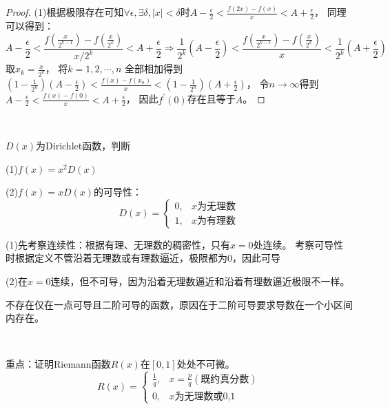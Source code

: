 \begin{proof}
  (1)根据极限存在可知$\forall \epsilon, \exists \delta, |x| < \delta$时$A - \frac{\epsilon}{2} < \frac{f(2x) - f(x)}{x} < A + \frac{\epsilon}{2}$，
  同理可以得到：
  \begin{equation*}
    A - \frac{\epsilon}{2} < \frac{f(\frac{x}{2^{k-1}}) - f(\frac{x}{2^k})}{x/2^k} < A + \frac{\epsilon}{2} \Rightarrow \frac{1}{2^k}(A - \frac{\epsilon}{2}) < \frac{f(\frac{x}{2^{k-1}}) - f(\frac{x}{2^k})}{x} < \frac{1}{2^k} (A + \frac{\epsilon}{2})
  \end{equation*}
  取$x_k = \frac{x}{2^k}$，
  将$k = 1,2,\cdots,n$
  全部相加得到$(1 - \frac{1}{2^n})(A - \frac{\epsilon}{2}) < \frac{f(x) - f(x_n)}{x} < (1 - \frac{1}{2^n})(A + \frac{\epsilon}{2})$，
  令$n \rightarrow \infty$得到$A - \frac{\epsilon}{2} < \frac{f(x) - f(0)}{x} < A + \frac{\epsilon}{2}$，
  因此$f^{\prime}(0)$存在且等于$A$。
\end{proof}

~

\begin{exercise}[Dirichlet函数的可微性]
  $D(x)$为Dirichlet函数，判断

  (1)$f(x) = x^2D(x)$

  (2)$f(x) = xD(x)$的可导性：
  \begin{equation*}
    D(x) =
    \begin{cases}
      0, & x\text{为无理数}\\
      1, & x\text{为有理数}
    \end{cases}
  \end{equation*}
\end{exercise}

\begin{solution}
  (1)先考察连续性：根据有理、无理数的稠密性，只有$x = 0$处连续。
  考察可导性时根据定义不管沿着无理数或有理数逼近，极限都为$0$，因此可导

  (2)在$x = 0$连续，但不可导，因为沿着无理数逼近和沿着有理数逼近极限不一样。
\end{solution}

\begin{note}
  不存在仅在一点可导且二阶可导的函数，原因在于二阶可导要求导数在一个小区间内存在。
\end{note}

~

\begin{exercise}[Riemann函数的不可微性]
  重点：证明Riemann函数$R(x)$在$[0,1]$处处不可微。
  \begin{equation*}
    R(x) =
    \begin{cases}
      \frac{1}{q}, & x = \frac{p}{q}(\text{既约真分数})\\
      0, & x\text{为无理数或0,1}
    \end{cases}
  \end{equation*}
\end{exercise}

